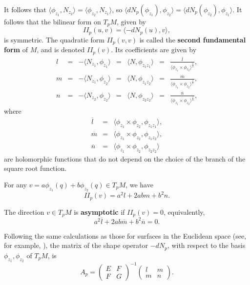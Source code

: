 \documentclass[12pt,a4paper]{article}
\begin{document}
It follows that $\langle \phi_{z_1}, {N_{z_2}}\rangle=\langle \phi_{z_2}, {N_{z_1}}\rangle$, so  
$\langle dN_p(\phi_{z_1}),\phi_{z_2}\rangle =\langle dN_p(\phi_{z_2}),\phi_{z_1}\rangle$. It follows that 
 the bilinear form on $T_pM$, given by
$$
II_p(u,v)=\langle -dN_p(u), {v}\rangle,
$$
is symmetric. The quadratic form 
$II_p(v,v)$ is called the {\bf second fundamental form} of $M$, and is denoted $II_p(v)$. Its coefficients are given by
$$
\begin{array}{ccccccc}
	l&=&-\langle N_{z_1},\phi_{z_1}\rangle&=& \langle N,\phi_{z_1z_1}\rangle&=&\frac{\overline{l}}{\langle {\phi_{z_1}\times\phi_{z_2}}\rangle ^{\frac12}},\\
	m&=&-\langle N_{z_1},\phi_{z_2}\rangle&=& \langle N,\phi_{z_1z_2}\rangle&=&\frac{\overline{m}}{\langle{\phi_{z_1}\times\phi_{z_2}}\rangle ^{\frac12}},\\
	n&=&-\langle N_{z_2},\phi_{z_2}\rangle&=& \langle N,\phi_{z_2z_2}\rangle&=&\frac{\overline{n}}{\langle{\phi_{z_1}\times\phi_{z_2}}\rangle ^{\frac12}},
\end{array}
$$
where
$$
\begin{array}{ccc}
\overline{l}&=&
    \langle \phi_{z_1}\times \phi_{z_2},\phi_{z_1z_1}\rangle,\\
\overline{m}&=&
    \langle \phi_{z_1}\times \phi_{z_2},\phi_{z_1z_2}\rangle,\\
    \overline{n}&=&
    \langle \phi_{z_1}\times \phi_{z_2},\phi_{z_2z_2}\rangle
\end{array}
$$
are holomorphic functions that do not depend on the choice of the branch of the square root function.

For any $v=a\phi_{z_1}(q)+b\phi_{z_2}(q)\in T_pM$, we have 
$$
II_p(v)=a^2l+2ab m+b^2n.
$$

The direction $v\in T_pM$ is \textbf{asymptotic} if $II_p(v)=0$, equivalently,
$$
a^2\overline{l}+2ab \overline{m}+b^2\overline{n}=0.
$$

Following the same calculations as those for surfaces in the Euclidean space (see, for example, \cite{doCarmo}), the matrix of the shape operator  $-dN_p$, with respect to the basis $\phi_{z_1}, \phi_{z_2}$ of $T_pM$, is
$$
A_p=
\left(
\begin{array}{cc}
E&F\\
F&G
\end{array}
\right)^{-1}\left(
\begin{array}{cc}
	l&m\\
	m&n
\end{array}
\right).
$$
\end{document}
